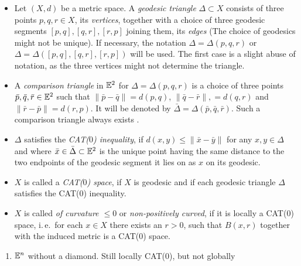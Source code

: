 
\begin{defin}
  \label{def:cat}
  \begin{itemize}
  \item Let \((X,d)\) be a metric space. A \emph{geodesic triangle} \(\Delta \subset X\) consists of three points \(p,q,r \in X\), its \emph{vertices}, together with a choice of three geodesic segments \([p,q], [q,r], [r, p]\) joining them, its \emph{edges} (The choice of geodesics might not be unique). If necessary, the notation \(\Delta = \Delta(p,q,r)\) or \(\Delta = \Delta([p,q], [q,r], [r,p])\) will be used. The first case is a slight abuse of notation, as the three vertices might not determine the triangle.
  \item A \emph{comparison triangle} in \(\mathbb{E}^2\) for \(\Delta = \Delta(p,q,r)\) is a choice of three points \(\bar p, \bar q, \bar r \in \mathbb{E}^2\) such that \(\|\bar p- \bar q\| = d(p, q)\), \(\|\bar q- \bar r\|, = d(q, r)\) and \(\|\bar r- \bar p\| = d(r, p)\). It will be denoted by \(\bar \Delta = \Delta(\bar p, \bar q, \bar r)\). Such a comparison triangle always exists \cite[cf.][Sec.\ I.2]{MR1744486}.
  \item \(\Delta\) satisfies the \emph{CAT(\(0\)) inequality}, if \(d(x,y) \leq \|\bar x- \bar y\|\) for any \(x, y \in \Delta\) and where \(\bar x \in \bar \Delta \subset \mathbb{E}^2\) is the unique point having the same distance to the two endpoints of the geodesic segment it lies on as \(x\) on its geodesic.
  \item \(X\) is called a \emph{CAT(\(0\)) space}, if \(X\) is geodesic and if each geodesic triangle \(\Delta\) satisfies the CAT(\(0\)) inequality.
  \item \(X\) is called \emph{of curvature \(\leq 0\)} or \emph{non-positively curved}, if it is locally a CAT(\(0\)) space, i.\,e.\ for each \(x \in X\) there exists an \(r > 0\), such that \(B(x,r)\) together with the induced metric is a CAT(\(0\)) space.
  \end{itemize}
\end{defin}

\begin{bsp}
  \begin{enumerate}
  \item \(\mathbb{E}^n\) without a diamond. Still locally CAT(0), but not globally
  \end{enumerate}
\end{bsp}


